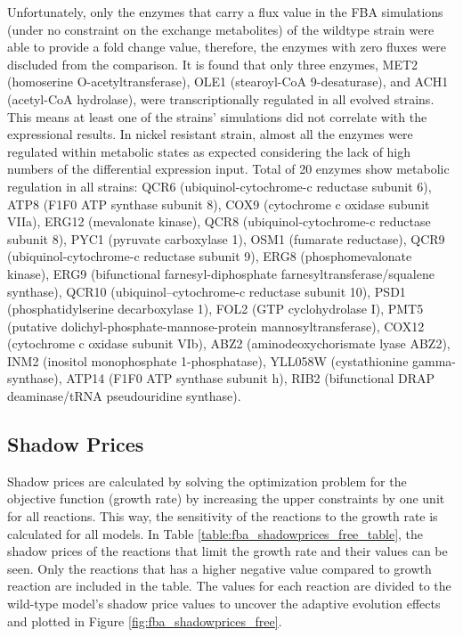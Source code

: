 Unfortunately, only the enzymes that carry a flux value in the FBA simulations (under no constraint on the exchange metabolites) of the wildtype strain were able to provide a fold change value, therefore, the enzymes with zero fluxes were discluded from the comparison. It is found that only three enzymes, MET2 (homoserine O-acetyltransferase), OLE1 (stearoyl-CoA 9-desaturase), and ACH1 (acetyl-CoA hydrolase), were transcriptionally regulated in all evolved strains. This means at least one of the strains' simulations did not correlate  with the expressional results. In nickel resistant strain, almost all the enzymes were regulated within metabolic states as expected considering the lack of high numbers of the differential expression input. Total of 20 enzymes show metabolic regulation in all strains: QCR6 (ubiquinol-cytochrome-c reductase subunit 6), ATP8 (F1F0 ATP synthase subunit 8), COX9 (cytochrome c oxidase subunit VIIa), ERG12 (mevalonate kinase), QCR8 (ubiquinol-cytochrome-c reductase subunit 8), PYC1 (pyruvate carboxylase 1), OSM1 (fumarate reductase), QCR9 (ubiquinol-cytochrome-c reductase subunit 9), ERG8 (phosphomevalonate kinase), ERG9 (bifunctional farnesyl-diphosphate farnesyltransferase/squalene synthase), QCR10 (ubiquinol--cytochrome-c reductase subunit 10), PSD1 (phosphatidylserine decarboxylase 1), FOL2 (GTP cyclohydrolase I), PMT5 (putative dolichyl-phosphate-mannose-protein mannosyltransferase), COX12 (cytochrome c oxidase subunit VIb), ABZ2 (aminodeoxychorismate lyase ABZ2), INM2 (inositol monophosphate 1-phosphatase), YLL058W (cystathionine gamma-synthase), ATP14 (F1F0 ATP synthase subunit h), RIB2 (bifunctional DRAP deaminase/tRNA pseudouridine synthase).

\subsection{Shadow Prices}
Shadow prices are calculated by solving the optimization problem for the objective function (growth rate) by increasing the upper constraints by one unit for all reactions. This way, the sensitivity of the reactions to the growth rate is calculated for all models. In Table \ref{table:fba_shadowprices_free_table}, the shadow prices of the reactions that limit the growth rate and their values can be seen. Only the reactions that has a higher negative value compared to growth reaction are included in the table. The values for each reaction are divided to the wild-type model's shadow price values to uncover the adaptive evolution effects and plotted in Figure \ref{fig:fba_shadowprices_free}.

